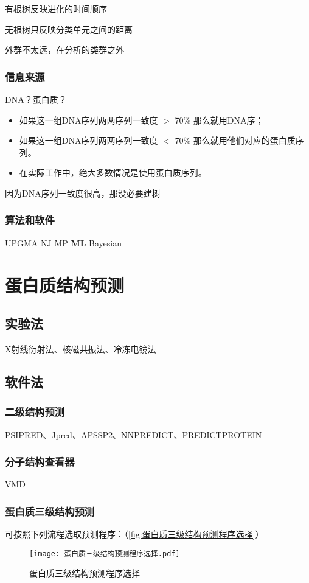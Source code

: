有根树反映进化的时间顺序

无根树只反映分类单元之间的距离

外群不太远，在分析的类群之外

\subsubsection{信息来源}

DNA？蛋白质？

\begin{itemize}
	\item 如果这一组DNA序列两两序列一致度 $>$ 70\% 那么就用DNA序；
	\item 如果这一组DNA序列两两序列一致度 $<$ 70\% 那么就用他们对应的蛋白质序列。
	\item 在实际工作中，绝大多数情况是使用蛋白质序列。
\end{itemize}

因为DNA序列一致度很高，那没必要建树

\subsubsection{算法和软件}

UPGMA NJ MP \textbf{ML} Bayesian


\section{蛋白质结构预测}

\subsection{实验法}

X射线衍射法、核磁共振法、冷冻电镜法

\subsection{软件法}

\subsubsection{二级结构预测}

PSIPRED、Jpred、APSSP2、NNPREDICT、PREDICTPROTEIN

\subsubsection{分子结构查看器}

VMD



\subsubsection{蛋白质三级结构预测}

可按照下列流程选取预测程序：（\autoref{fig:蛋白质三级结构预测程序选择}）

\begin{figure}[htbp]
	\centering
	\texttt{[image: 蛋白质三级结构预测程序选择.pdf]}
	\caption{蛋白质三级结构预测程序选择}
	\label{fig:蛋白质三级结构预测程序选择}
\end{figure}
